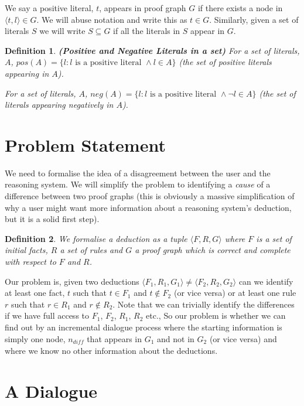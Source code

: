 \documentclass{blue-book}
\newtheorem{definition}{Definition}
\begin{document}
We say a positive literal, $t$, appears in proof graph $G$ if there exists a node in $\langle t, l\rangle \in G$. We will abuse notation and write this as $t \in G$.  Similarly, given a set of literals $S$ we will write $S \subseteq G$ if all the literals in $S$ appear in $G$. 

\begin{definition}{\bf (Positive and Negative Literals in a set)}
For a set of literals, $A$, $pos(A) = \{l: l \text{ is a positive literal } \wedge l \in A\}$ (the set of positive literals appearing in $A$).

For a set of literals, $A$, $neg(A) = \{l: l \text{ is a positive literal } \wedge \neg l \in A\}$ (the set of literals appearing negatively in $A$).
\end{definition}


\section{Problem Statement}

We need to formalise the idea of a disagreement between the user and the reasoning system.  We will simplify the problem to identifying a \emph{cause} of a difference between two proof graphs (this is obviously a massive simplification of why a user might want more information about a reasoning system's deduction, but it is a solid first step).

\begin{definition}
We formalise a deduction as a tuple $\langle F, R, G\rangle$ where $F$ is a set of initial facts, $R$ a set of rules and $G$ a proof graph which is correct and complete with respect to $F$ and $R$.
\end{definition}

Our problem is, given two deductions $\langle F_1, R_1, G_1\rangle \neq \langle F_2, R_2, G_2\rangle$ can we identify at least one fact, $t$ such that $t \in F_1$ and $t \not\in F_2$ (or vice versa) or at least one rule $r$ such that $r \in R_1$ and $r\not\in R_2$.  Note that we can trivially identify the differences if we have full access to $F_1$, $F_2$, $R_1$, $R_2$ etc., So our problem is whether we can find out by an incremental dialogue process where the starting information is simply one node, $n_{\mathit{diff}}$ that appears in $G_1$ and not in $G_2$ (or vice versa) and where we know no other information about the deductions.


\section{A Dialogue}
\end{document}
